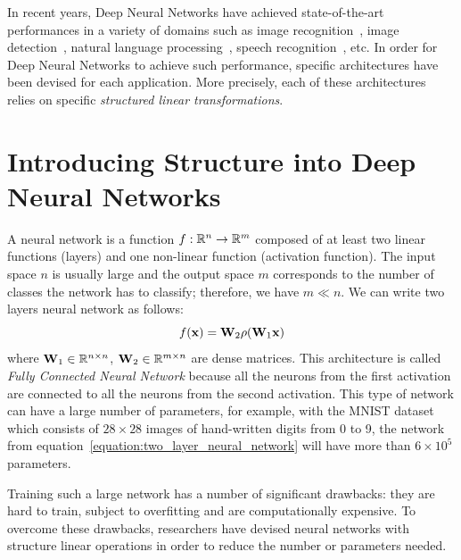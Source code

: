 In recent years, Deep Neural Networks have achieved state-of-the-art performances in a variety of domains such as image recognition~\cite{lecun1998gradient,krizhevsky2012imagenet,He_2016_CVPR,tan2019efficientnet}, image detection~\cite{redmon2016you}, natural language processing~\cite{radford2018Language}, speech recognition~\citet{hinton2012deep}, etc. 
In order for Deep Neural Networks to achieve such performance, specific architectures have been devised for each application.
More precisely, each of these architectures relies on specific \emph{structured linear transformations}.


\section{Introducing Structure into Deep Neural Networks}

A neural network is a function $f:{\mathbb{R}}^n \rightarrow {\ensuremath \mathbb{R}}^m$ composed of at least two linear functions (layers) and one non-linear function (activation function).
The input space $n$ is usually large and the output space $m$ corresponds to the number of classes the network has to classify; therefore, we have $m \ll n$.
We can write two layers neural network as follows:
\begin{equation}
  f(\mathbf{x}) = \mathbf{W}_2 \rho(\mathbf{W}_1 \mathbf{x})
  \label{equation:two_layer_neural_network}
\end{equation}
where $\mathbf{W}_1 \in {\ensuremath \mathbb{R}}^{n \times n}$, $\mathbf{W}_2 \in {\ensuremath \mathbb{R}}^{m \times n}$ are dense matrices.
This architecture is called \emph{Fully Connected Neural Network} because all the neurons from the first activation are connected to all the neurons from the second activation.
This type of network can have a large number of parameters, for example, with the MNIST dataset~\cite{lecun1998gradient} which consists of $28 \times 28$ images of hand-written digits from 0 to 9, the network from equation~\ref{equation:two_layer_neural_network} will have more than $6 \times 10^5$ parameters.



Training such a large network has a number of significant drawbacks: they are hard to train, subject to overfitting and are computationally expensive.
To overcome these drawbacks, researchers have devised neural networks with structure linear operations in order to reduce the number or parameters needed. 



